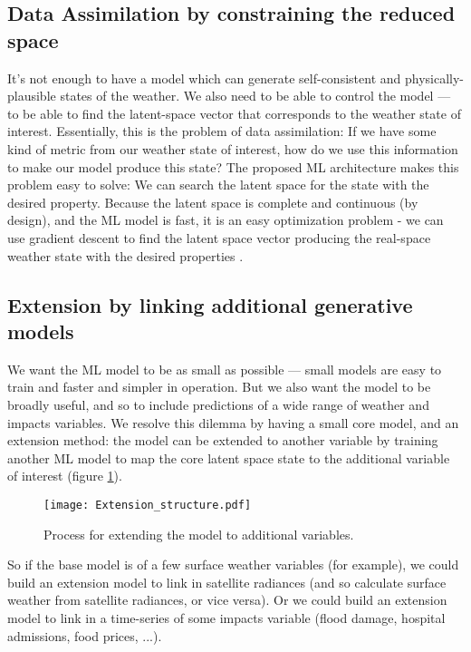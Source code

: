 \documentclass{ametsocV6.1}
\begin{document}
\subsection{Data Assimilation by constraining the reduced space}
\label{section_DA}

It's not enough to have a model which can generate self-consistent and physically-plausible states of the weather. We also need to be able to control the model --- to be able to find the latent-space vector that corresponds to the weather state of interest. Essentially, this is the problem of data assimilation: If we have some kind of metric from our weather state of interest, how do we use this information to make our model produce this state?
The proposed ML architecture makes this problem easy to solve: We can search the latent space for the state with the desired property. Because the latent space is complete and continuous (by design), and the ML model is fast, it is an easy optimization problem - we can use gradient descent to find the latent space vector producing the real-space weather state with the desired properties \citep{MLDA}.

\subsection{Extension by linking additional generative models}
\label{extension}

We want the ML model to be as small as possible --- small models are easy to train and faster and simpler in operation. But we also want the model to be broadly useful, and so to include predictions of a wide range of weather and impacts variables. We resolve this dilemma by having a small core model, and an extension method: the model can be extended to another variable by training another ML model to map the core latent space state to the additional variable of interest (figure \ref{Extension_structure}).

\begin{figure}[h]
\texttt{[image: Extension\_structure.pdf]}
\caption{Process for extending the model to additional variables.}
\label{Extension_structure}
\end{figure}
     
So if the base model is of a few surface weather variables (for example), we could build an extension model to link in satellite radiances (and so calculate surface weather from satellite radiances, or vice versa). Or we could build an extension model to link in a time-series of some impacts variable (flood damage, hospital admissions, food prices, ...). 
\end{document}
